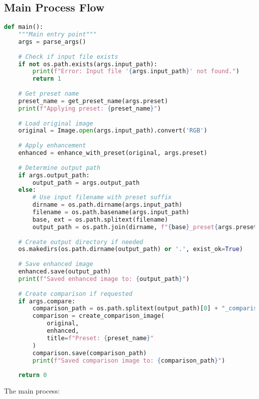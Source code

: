 \subsection{Main Process Flow}

\begin{lstlisting}[language=Python, caption=Main Process Function]
def main():
    """Main entry point"""
    args = parse_args()
    
    # Check if input file exists
    if not os.path.exists(args.input_path):
        print(f"Error: Input file '{args.input_path}' not found.")
        return 1
    
    # Get preset name
    preset_name = get_preset_name(args.preset)
    print(f"Applying preset: {preset_name}")
    
    # Load original image
    original = Image.open(args.input_path).convert('RGB')
    
    # Apply enhancement
    enhanced = enhance_with_preset(original, args.preset)
    
    # Determine output path
    if args.output_path:
        output_path = args.output_path
    else:
        # Use input filename with preset suffix
        dirname = os.path.dirname(args.input_path)
        filename = os.path.basename(args.input_path)
        base, ext = os.path.splitext(filename)
        output_path = os.path.join(dirname, f"{base}_preset{args.preset}{ext}")
    
    # Create output directory if needed
    os.makedirs(os.path.dirname(output_path) or '.', exist_ok=True)
    
    # Save enhanced image
    enhanced.save(output_path)
    print(f"Saved enhanced image to: {output_path}")
    
    # Create comparison if requested
    if args.compare:
        comparison_path = os.path.splitext(output_path)[0] + "_comparison.png"
        comparison = create_comparison_image(
            original, 
            enhanced,
            title=f"Preset: {preset_name}"
        )
        comparison.save(comparison_path)
        print(f"Saved comparison image to: {comparison_path}")
    
    return 0
\end{lstlisting}

The main process:

